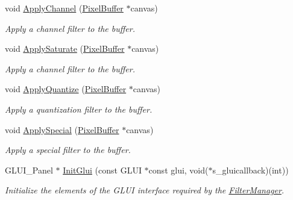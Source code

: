 \begin{DoxyCompactItemize}
void \hyperlink{classimage__tools_1_1FilterManager_a0440c9cd3919ccc16943053e9f5ce289}{Apply\+Channel} (\hyperlink{classimage__tools_1_1PixelBuffer}{Pixel\+Buffer} $\ast$canvas)
\begin{DoxyCompactList}\small\item\em Apply a channel filter to the buffer. \end{DoxyCompactList}\item 
void \hyperlink{classimage__tools_1_1FilterManager_a67a9ca0b9d5f46c8986f72ae3beb2eb0}{Apply\+Saturate} (\hyperlink{classimage__tools_1_1PixelBuffer}{Pixel\+Buffer} $\ast$canvas)
\begin{DoxyCompactList}\small\item\em Apply a channel filter to the buffer. \end{DoxyCompactList}\item 
void \hyperlink{classimage__tools_1_1FilterManager_a982a22baf603a17041632a1c3e0af570}{Apply\+Quantize} (\hyperlink{classimage__tools_1_1PixelBuffer}{Pixel\+Buffer} $\ast$canvas)
\begin{DoxyCompactList}\small\item\em Apply a quantization filter to the buffer. \end{DoxyCompactList}\item 
void \hyperlink{classimage__tools_1_1FilterManager_a4c7fc24c4619d184a55a2a1f7bf57198}{Apply\+Special} (\hyperlink{classimage__tools_1_1PixelBuffer}{Pixel\+Buffer} $\ast$canvas)
\begin{DoxyCompactList}\small\item\em Apply a special filter to the buffer. \end{DoxyCompactList}\item 
G\+L\+U\+I\+\_\+\+Panel $\ast$ \hyperlink{classimage__tools_1_1FilterManager_a613964542f112cb163a530b542aaa66e}{Init\+Glui} (const G\+L\+UI $\ast$const glui, void($\ast$s\+\_\+gluicallback)(int))
\begin{DoxyCompactList}\small\item\em Initialize the elements of the G\+L\+UI interface required by the \hyperlink{classimage__tools_1_1FilterManager}{Filter\+Manager}. \end{DoxyCompactList}\end{DoxyCompactItemize}

